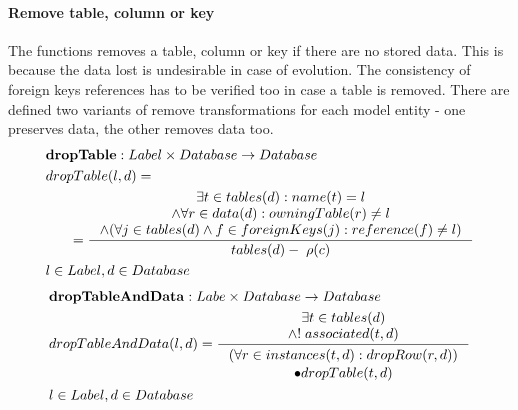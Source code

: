 \documentclass[11pt]{article}
\begin{document}
\paragraph{Remove table, column or key} The functions removes a table, column or key if there are no stored data. This is because the data lost is undesirable in case of evolution. The consistency of foreign keys references has to be verified too in case a table is removed.  There are defined two variants of remove transformations for each model entity - one preserves data, the other removes data too.
\begin{align*}
&	\mathbf{dropTable} : Label \times Database \rightarrow Database \\
&	dropTable(l,d) = \\
& \;\;\;\;\;\; =\inference{ \exists t \in tables(d) : name(t) = l  \\ \wedge \forall r \in data(d) : owningTable(r) \neq l \\  \wedge (\forall j \in tables(d) \wedge f \in foreignKeys(j) : reference(f) \neq l) }{ tables(d) - \; \rho(c)}\\
& l \in Label, d \in Database
\end{align*}
\begin{align*}
&	\mathbf{dropTableAndData} : Labe \times Database \rightarrow Database \\
&	dropTableAndData(l, d) = \inference{\exists t \in tables(d) \\ \wedge ! \; associated(t, d)}{\begin{gathered}
	(\forall r \in instances(t,d) : dropRow(r, d))\\ \bullet dropTable(t,d)
\end{gathered}}
	\\& l \in Label, d \in Database
\end{align*}
\end{document}
